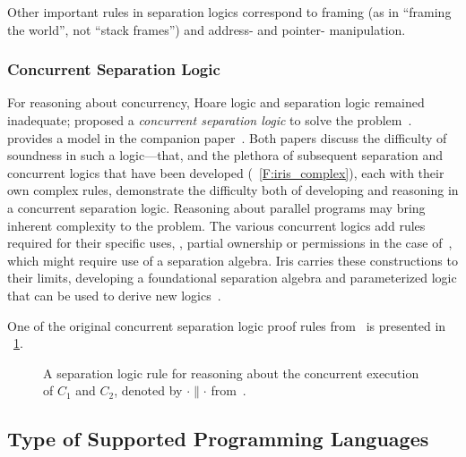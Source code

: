 Other important rules in separation logics correspond to framing (as in
``framing the world'', not ``stack frames'') and address- and pointer-
manipulation.

\subsubsection{Concurrent Separation Logic}

For reasoning about concurrency, Hoare logic and separation logic remained
inadequate; \citeauthor{O_Hearn_2007} proposed a \emph{concurrent separation
logic} to solve the problem~\cite{O_Hearn_2007}. \citeauthor{Brookes_2007}
provides a model in the companion paper~\cite{Brookes_2007}. Both papers discuss
the difficulty of soundness in such a logic---that, and the plethora of
subsequent separation and concurrent logics that have been developed
(\figurename~\ref{F:iris_complex}), each with their own complex rules,
demonstrate the difficulty both of developing and reasoning in a concurrent
separation logic. Reasoning about parallel programs may bring inherent
complexity to the problem. The various concurrent logics add rules required for
their specific uses, \eg, partial ownership or permissions in the case
of~\cite{Appel_2011}, which might require use of a separation algebra. Iris
carries these constructions to their limits, developing a foundational
separation algebra and parameterized logic that can be used to derive new
logics~\cite{Jung_2018b}.

One of the original concurrent separation logic proof rules
from~\cite{O_Hearn_2007} is presented in \figurename~\ref{F:CSL_ex}.

\begin{figure}
    \centering
    \caption{A separation logic rule for reasoning about the concurrent
    execution of \(C_1\) and \(C_2\), denoted by \(\cdot \parallel \cdot\)
    from~\cite{O_Hearn_2007}.}\label{F:CSL_ex}
\end{figure}

\subsection{Type of Supported Programming Languages}\label{S:t_pl}


